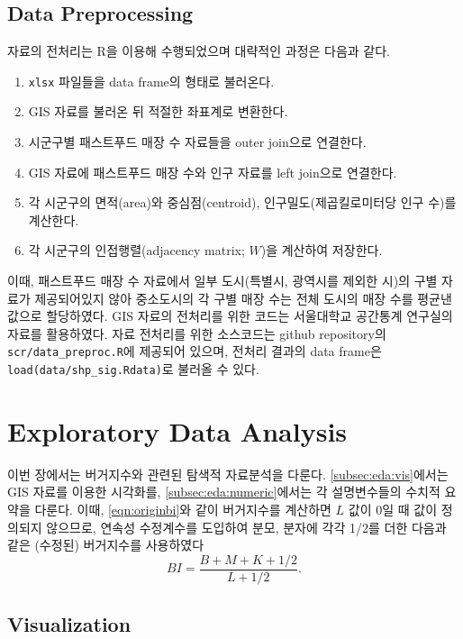 \documentclass{scrartcl}
\begin{document}
\subsection{Data Preprocessing}\label{subsec:data:preproc}

자료의 전처리는 R을 이용해 수행되었으며 대략적인 과정은 다음과 같다. 
\begin{enumerate}
    \item \texttt{xlsx} 파일들을 data frame의 형태로 불러온다.
    \item GIS 자료를 불러온 뒤 적절한 좌표계로 변환한다.
    \item 시군구별 패스트푸드 매장 수 자료들을 outer join으로 연결한다.
    \item GIS 자료에 패스트푸드 매장 수와 인구 자료를 left join으로 연결한다. 
    \item 각 시군구의 면적(area)와 중심점(centroid), 인구밀도(제곱킬로미터당 인구 수)를 계산한다.
    \item 각 시군구의 인접행렬(adjacency matrix; $W$)을 계산하여 저장한다.
\end{enumerate}

이때, 패스트푸드 매장 수 자료에서 일부 도시(특별시, 광역시를 제외한 시)의 구별 자료가 제공되어있지 않아 중소도시의 각 구별 매장 수는 전체 도시의 매장 수를 평균낸 값으로 할당하였다. GIS 자료의 전처리를 위한 코드는 서울대학교 공간통계 연구실의 자료를 활용하였다. 자료 전처리를 위한 소스코드는 github repository의 \texttt{scr/data\_preproc.R}에 제공되어 있으며, 전처리 결과의 data frame은 \texttt{load(data/shp\_sig.Rdata)}로 불러올 수 있다.

\section{Exploratory Data Analysis}\label{sec:eda}

이번 장에서는 버거지수와 관련된 탐색적 자료분석을 다룬다. \autoref{subsec:eda:vis}에서는 GIS 자료를 이용한 시각화를, \autoref{subsec:eda:numeric}에서는 각 설명변수들의 수치적 요약을 다룬다. 이때, \autoref{eqn:originbi}와 같이 버거지수를 계산하면 $L$ 값이 0일 때 값이 정의되지 않으므로, 연속성 수정계수를 도입하여 분모, 분자에 각각 1/2를 더한 다음과 같은 (수정된) 버거지수를 사용하였다
\begin{equation}\label{eqn:bi}
    BI = \frac{B+M+K+1/2}{L+1/2}.
\end{equation}

\subsection{Visualization}\label{subsec:eda:vis}
\end{document}
